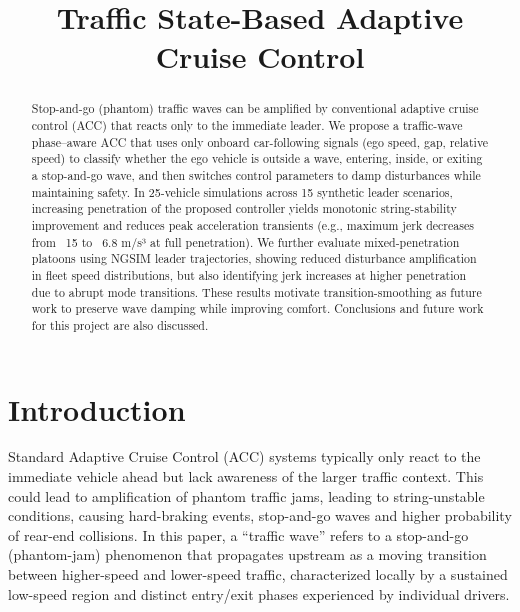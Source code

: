 \documentclass[conference]{IEEEtran}
\title{Traffic State-Based Adaptive Cruise Control}
\author{
\IEEEauthorblockN{
Kate Sanborn\IEEEauthorrefmark{1},
Quang Pham\IEEEauthorrefmark{1},
Daechul Jung\IEEEauthorrefmark{1},
Dan Work\IEEEauthorrefmark{1},
Jonathan Sprinkle\IEEEauthorrefmark{1}
}

\IEEEauthorblockA{
\IEEEauthorrefmark{1}Department of Computer Science, Vanderbilt University\\
Nashville, TN 37235, USA\\
jonathan.sprinkle@vanderbilt.edu
}
}
\begin{document}
\maketitle

\begin{abstract}
Stop-and-go (phantom) traffic waves can be amplified by conventional adaptive cruise control (ACC) that reacts only to the immediate leader. We propose a traffic-wave phase–aware ACC that uses only onboard car-following signals (ego speed, gap, relative speed) to classify whether the ego vehicle is outside a wave, entering, inside, or exiting a stop-and-go wave, and then switches control parameters to damp disturbances while maintaining safety. In 25-vehicle simulations across 15 synthetic leader scenarios, increasing penetration of the proposed controller yields monotonic string-stability improvement and reduces peak acceleration transients (e.g., maximum jerk decreases from ~15 to ~6.8 m/s³ at full penetration). We further evaluate mixed-penetration platoons using NGSIM leader trajectories, showing reduced disturbance amplification in fleet speed distributions, but also identifying jerk increases at higher penetration due to abrupt mode transitions. These results motivate transition-smoothing as future work to preserve wave damping while improving comfort. Conclusions and future work for this project are also discussed.
\end{abstract}


\section{Introduction}


Standard Adaptive Cruise Control (ACC) systems typically only react to the immediate vehicle ahead but lack awareness of the larger traffic context. This could lead to amplification of phantom traffic jams, leading to string-unstable conditions, causing hard-braking events, stop-and-go waves and higher probability of rear-end collisions. In this paper, a “traffic wave” refers to a stop-and-go (phantom-jam) phenomenon that propagates upstream as a moving transition between higher-speed and lower-speed traffic, characterized locally by a sustained low-speed region and distinct entry/exit phases experienced by individual drivers.
\end{document}
